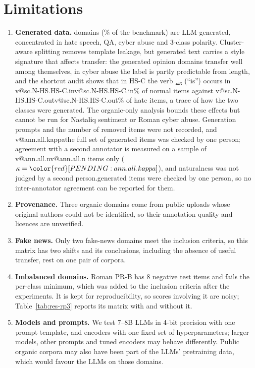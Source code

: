\documentclass[acmsmall,screen]{acmart}
\makeatletter
\newcommand{\ur}[1]{{\urdufont\beginR #1\endR}}
\newcommand{\pending}[1]{{\color{red}[PENDING: #1]}}
\newcommand{\val}[1]{\ifcsname v@#1\endcsname\csname v@#1\endcsname\else\pending{#1}\fi}
\newcommand{\ifannotated}[2]{\ifcsname v@ann.all.kappa\endcsname#1\else#2\fi}
\makeatother
\begin{document}
\section{Limitations}\label{sec:limitations}
\begin{enumerate}[leftmargin=*,itemsep=2pt]
\item \textbf{Generated data.} \NumSynthDomains{} domains (\PctSynth\% of the benchmark) are LLM-generated, concentrated in hate speech, QA, cyber abuse and 3-class polarity. Cluster-aware splitting removes template leakage, but generated text carries a style signature that affects transfer: the generated opinion domains transfer well among themselves, in cyber abuse the label is partly predictable from length, and the shortcut audit shows that in HS-C the verb \ur{ہے} (``is'') occurs in \val{sc.N-HS.HS-C.in}\% of normal items against \val{sc.N-HS.HS-C.out}\% of hate items, a trace of how the two classes were generated. The organic-only analysis bounds these effects but cannot be run for Nastaliq sentiment or Roman cyber abuse. Generation prompts and the number of removed items were not recorded, and \ifannotated{the full set of generated items was checked by one person; agreement with a second annotator is measured on a sample of \val{ann.all.n} items only ($\kappa=\val{ann.all.kappa}$), and naturalness was not judged by a second person.}{generated items were checked by one person, so no inter-annotator agreement can be reported for them.}
\item \textbf{Provenance.} Three organic domains come from public uploads whose original authors could not be identified, so their annotation quality and licences are unverified.
\item \textbf{Fake news.} Only two fake-news domains meet the inclusion criteria, so this matrix has two shifts and its conclusions, including the absence of useful transfer, rest on one pair of corpora.
\item \textbf{Imbalanced domains.} Roman PR-B has 8 negative test items and fails the per-class minimum, which was added to the inclusion criteria after the experiments. It is kept for reproducibility, so scores involving it are noisy; Table~\ref{tab:res-rp3} reports its matrix with and without it.
\item \textbf{Models and prompts.} We test 7--8B LLMs in 4-bit precision with one prompt template, and encoders with one fixed set of hyperparameters; larger models, other prompts and tuned encoders may behave differently. Public organic corpora may also have been part of the LLMs' pretraining data, which would favour the LLMs on those domains.

\end{enumerate}
\end{document}

